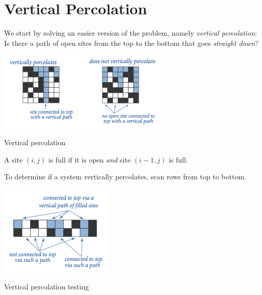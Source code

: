 \documentclass[8pt,a4paper,compress,handout]{beamer}
\begin{document}
\section{Vertical Percolation}
\begin{frame}[fragile]
We start by solving an easier version of the problem, namely \emph{vertical percolation}: Is there a path of open sites from the top to the bottom that goes \emph{straight down}?

\begin{center}
\includegraphics[scale=0.4]{figures/percolation5.png}

\smallskip

\tiny Vertical percolation
\end{center}

\bigskip

A site $(i, j)$ is full if it is open \emph{and} site $(i-1, j)$ is full.

\bigskip

To determine if a system vertically percolates, scan rows from top to bottom.

\begin{center}
\includegraphics[scale=0.4]{figures/percolation6.png}

\smallskip

\tiny Vertical percolation testing
\end{center}
\end{frame}
\end{document}
